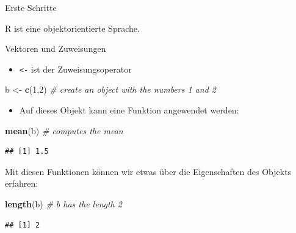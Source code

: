 \documentclass[ignorenonframetext,]{beamer}
\newenvironment{Shaded}{\begin{snugshade}}{\end{snugshade}}
\newcommand{\KeywordTok}[1]{\textcolor[rgb]{0.26,0.66,0.93}{\textbf{#1}}}
\newcommand{\DecValTok}[1]{\textcolor[rgb]{0.27,0.67,0.26}{#1}}
\newcommand{\StringTok}[1]{\textcolor[rgb]{0.02,0.61,0.04}{#1}}
\newcommand{\CommentTok}[1]{\textcolor[rgb]{0.00,0.40,1.00}{\textit{#1}}}
\newcommand{\NormalTok}[1]{\textcolor[rgb]{0.74,0.68,0.62}{#1}}
\providecommand{\tightlist}{%
  \setlength{\itemsep}{0pt}\setlength{\parskip}{0pt}}
\begin{document}
\begin{frame}{Erste Schritte}

\end{frame}

\begin{frame}[fragile]{R ist eine objektorientierte Sprache.}

\begin{block}{Vektoren und Zuweisungen}

\begin{itemize}
\tightlist
\item
  \texttt{\textless{}-} ist der Zuweisungsoperator
\end{itemize}

\begin{Shaded}
\begin{Highlighting}[]
\NormalTok{b <-}\StringTok{ }\KeywordTok{c}\NormalTok{(}\DecValTok{1}\NormalTok{,}\DecValTok{2}\NormalTok{) }\CommentTok{# create an object with the numbers 1 and 2}
\end{Highlighting}
\end{Shaded}

\begin{itemize}
\tightlist
\item
  Auf dieses Objekt kann eine Funktion angewendet werden:
\end{itemize}

\begin{Shaded}
\begin{Highlighting}[]
\KeywordTok{mean}\NormalTok{(b) }\CommentTok{# computes the mean}
\end{Highlighting}
\end{Shaded}

\begin{verbatim}
## [1] 1.5
\end{verbatim}

Mit diesen Funktionen können wir etwas über die Eigenschaften des
Objekts erfahren:

\begin{Shaded}
\begin{Highlighting}[]
\KeywordTok{length}\NormalTok{(b) }\CommentTok{# b has the length 2}
\end{Highlighting}
\end{Shaded}

\begin{verbatim}
## [1] 2
\end{verbatim}

\end{block}


\end{frame}
\end{document}
